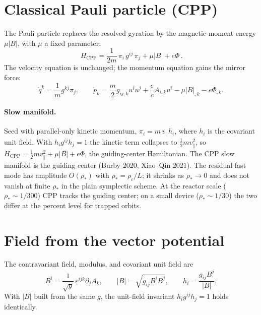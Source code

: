 \documentclass[11pt]{article}
\newcommand{\half}{\tfrac12}
\begin{document}
\section{Classical Pauli particle (CPP)}
The Pauli particle replaces the resolved gyration by the magnetic-moment energy
$\mu|B|$, with $\mu$ a fixed parameter:
\begin{equation}
\boxed{\,H_{\mathrm{CPP}}=\frac{1}{2m}\,\pi_i\,g^{ij}\,\pi_j+\mu|B|+e\Phi\,.}
\end{equation}
The velocity equation is unchanged; the momentum equation gains the mirror force:
\begin{equation}
\dot q^k=\frac1m g^{kj}\pi_j,
\qquad
\dot p_k=\frac{m}{2}g_{ij,k}u^iu^j+\frac{e}{c}A_{i,k}u^i-\mu|B|_{,k}-e\Phi_{,k}.
\end{equation}
\paragraph{Slow manifold.}
Seed with parallel-only kinetic momentum, $\pi_i=m\,v_\parallel h_i$, where $h_i$
is the covariant unit field. With $h_ig^{ij}h_j=1$ the kinetic term collapses to
$\half m v_\parallel^2$, so
$H_{\mathrm{CPP}}=\half m v_\parallel^2+\mu|B|+e\Phi$, the guiding-center
Hamiltonian. The CPP slow manifold is the guiding center (Burby 2020,
Xiao--Qin 2021). The residual fast mode has amplitude $O(\rho_*)$ with
$\rho_*=\rho_c/L$; it shrinks as $\rho_*\to0$ and does not vanish at finite
$\rho_*$ in the plain symplectic scheme. At the reactor scale ($\rho_*\sim1/300$)
CPP tracks the guiding center; on a small device ($\rho_*\sim1/30$) the two
differ at the percent level for trapped orbits.

\section{Field from the vector potential}
The contravariant field, modulus, and covariant unit field are
\begin{equation}
B^i=\frac{1}{\sqrt g}\,\varepsilon^{ijk}\partial_jA_k,
\qquad
|B|=\sqrt{g_{ij}B^iB^j},
\qquad
h_i=\frac{g_{ij}B^j}{|B|}.
\end{equation}
With $|B|$ built from the same $g$, the unit-field invariant
$h_ig^{ij}h_j=1$ holds identically.
\end{document}
